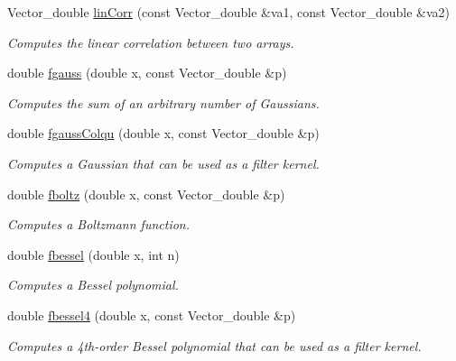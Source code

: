 \begin{DoxyCompactItemize}
Vector\_\-double \hyperlink{group__stfgen_gaa0386bf9c9ceb5499900af490e06e2ab}{linCorr} (const Vector\_\-double \&va1, const Vector\_\-double \&va2)
\begin{DoxyCompactList}\small\item\em Computes the linear correlation between two arrays. \item\end{DoxyCompactList}\item 
double \hyperlink{group__stfgen_gaa947b273fe10b4e93fdcba6865815a07}{fgauss} (double x, const Vector\_\-double \&p)
\begin{DoxyCompactList}\small\item\em Computes the sum of an arbitrary number of Gaussians. \item\end{DoxyCompactList}\item 
double \hyperlink{group__stfgen_gaf3e890196c425798f9d97ef3b4846837}{fgaussColqu} (double x, const Vector\_\-double \&p)
\begin{DoxyCompactList}\small\item\em Computes a Gaussian that can be used as a filter kernel. \item\end{DoxyCompactList}\item 
double \hyperlink{group__stfgen_ga1f97545508d6e155d20c896e5ce21f4d}{fboltz} (double x, const Vector\_\-double \&p)
\begin{DoxyCompactList}\small\item\em Computes a Boltzmann function. \item\end{DoxyCompactList}\item 
double \hyperlink{group__stfgen_gacb01a426bb2ab315da605e22cf1b176d}{fbessel} (double x, int n)
\begin{DoxyCompactList}\small\item\em Computes a Bessel polynomial. \item\end{DoxyCompactList}\item 
double \hyperlink{group__stfgen_gae0c21c43d67f957c3224d454319a7c00}{fbessel4} (double x, const Vector\_\-double \&p)
\begin{DoxyCompactList}\small\item\em Computes a 4th-\/order Bessel polynomial that can be used as a filter kernel. \item\end{DoxyCompactList}\item 

\end{DoxyCompactItemize}
